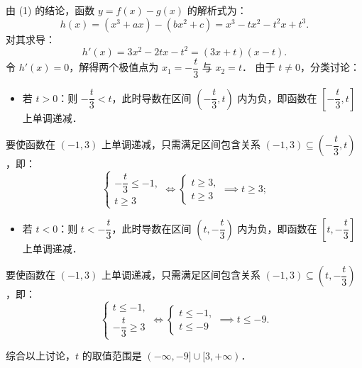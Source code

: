 \begin{answer}
由 (1) 的结论，函数 $y = f(x) - g(x)$ 的解析式为：
\nopagebreak[4]
\[
h(x) = (x^3 + ax) - (bx^2 + c) = x^3 - tx^2 - t^2x + t^3.
\]
对其求导：
\nopagebreak[4]
\[
h'(x) = 3x^2 - 2tx - t^2 = (3x + t)(x - t).
\]
令 $h'(x) = 0$，解得两个极值点为 $x_1 = -\dfrac{t}{3}$ 与 $x_2 = t$．
由于 $t \neq 0$，分类讨论：
\begin{itemize}
\item 若 $t > 0$：则 $-\dfrac{t}{3} < t$，此时导数在区间 $\left(-\dfrac{t}{3}, t\right)$ 内为负，即函数在 $\left[-\dfrac{t}{3}, t\right]$ 上单调递减．
\end{itemize}
  要使函数在 $(-1, 3)$ 上单调递减，只需满足区间包含关系 $(-1, 3) \subseteq \left(-\dfrac{t}{3}, t\right)$，即：
\nopagebreak[4]
\[
\begin{cases}
-\dfrac{t}{3} \leqslant -1, \\
t \geqslant 3
\end{cases}
\iff
\begin{cases}
t \geqslant 3, \\
t \geqslant 3
\end{cases}
\implies t \geqslant 3;
\]
\begin{itemize}
\item 若 $t < 0$：则 $t < -\dfrac{t}{3}$，此时导数在区间 $\left(t, -\dfrac{t}{3}\right)$ 内为负，即函数在 $\left[t, -\dfrac{t}{3}\right]$ 上单调递减．
\end{itemize}
  要使函数在 $(-1, 3)$ 上单调递减，只需满足区间包含关系 $(-1, 3) \subseteq \left(t, -\dfrac{t}{3}\right)$，即：
\nopagebreak[4]
\[
\begin{cases}
t \leqslant -1, \\
-\dfrac{t}{3} \geqslant 3
\end{cases}
\iff
\begin{cases}
t \leqslant -1, \\
t \leqslant -9
\end{cases}
\implies t \leqslant -9.
\]

综合以上讨论，$t$ 的取值范围是 $(-\infty, -9] \cup [3, +\infty)$．


\gkanswer{答案（2）：$(-\infty, -9] \cup [3, +\infty)$。}

\end{answer}
